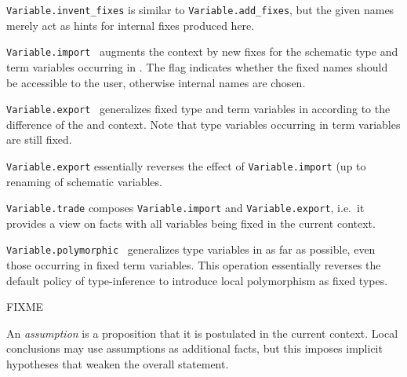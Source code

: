 \begin{isabellebody}
\begin{isamarkuptext}
\begin{description}
  \item \verb|Variable.invent_fixes| is similar to \verb|Variable.add_fixes|, but the given names merely act as hints for
  internal fixes produced here.

  \item \verb|Variable.import|~ augments the
  context by new fixes for the schematic type and term variables
  occurring in .  The  flag indicates
  whether the fixed names should be accessible to the user, otherwise
  internal names are chosen.

  \item \verb|Variable.export|~ generalizes
  fixed type and term variables in  according to the
  difference of the  and  context.  Note
  that type variables occurring in term variables are still fixed.

  \verb|Variable.export| essentially reverses the effect of \verb|Variable.import| (up to renaming of schematic variables.

  \item \verb|Variable.trade| composes \verb|Variable.import| and \verb|Variable.export|, i.e.\ it provides a view on facts with all
  variables being fixed in the current context.

  \item \verb|Variable.polymorphic|~ generalizes type
  variables in  as far as possible, even those occurring
  in fixed term variables.  This operation essentially reverses the
  default policy of type-inference to introduce local polymorphism as
  fixed types.

  \end{description}%
\end{isamarkuptext}%
\isamarkuptrue%
%
\endisatagmlref
{\isafoldmlref}%
%
\isadelimmlref
%
\endisadelimmlref
%
\begin{isamarkuptext}%
FIXME%
\end{isamarkuptext}%
\isamarkuptrue%
%
\isamarkuptrue%
%
\begin{isamarkuptext}%
An \emph{assumption} is a proposition that it is postulated in the
  current context.  Local conclusions may use assumptions as
  additional facts, but this imposes implicit hypotheses that weaken
  the overall statement.


\end{isamarkuptext}
\end{isabellebody}
